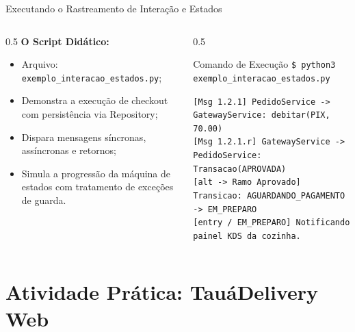 \documentclass[10pt]{beamer}
\begin{document}
\begin{frame}[fragile]{Executando o Rastreamento de Interação e Estados}
    \begin{columns}
        \begin{column}{0.5\textwidth}
            \textbf{O Script Didático:}
            \begin{itemize}
                \item Arquivo: \texttt{exemplo\_interacao\_estados.py};
                \item Demonstra a execução de checkout com persistência via Repository;
                \item Dispara mensagens síncronas, assíncronas e retornos;
                \item Simula a progressão da máquina de estados com tratamento de exceções de guarda.
            \end{itemize}
        \end{column}
        \begin{column}{0.5\textwidth}
            \begin{exampleblock}{Comando de Execução}
                \scriptsize\texttt{\$ python3 exemplo\_interacao\_estados.py}
            \end{exampleblock}
            \vspace{0.1cm}
            \tiny
            \texttt{[Msg   1.2.1] PedidoService -> GatewayService: debitar(PIX, 70.00)}\\
            \texttt{[Msg 1.2.1.r] GatewayService -> PedidoService: Transacao(APROVADA)}\\
            \texttt{[alt -> Ramo Aprovado] Transicao: AGUARDANDO\_PAGAMENTO -> EM\_PREPARO}\\
            \texttt{[entry / EM\_PREPARO] Notificando painel KDS da cozinha.}
        \end{column}
    \end{columns}
\end{frame}

\section{Atividade Prática: TauáDelivery Web}
\end{document}
